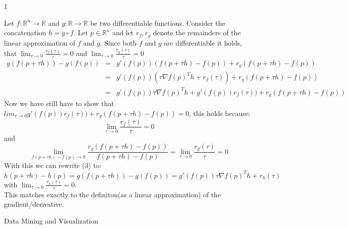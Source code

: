 \documentclass{article}
\begin{document}
\begin{ukon-infie}[12.11.17]{1}
		\begin{exercise}[p=10]{}
		Let $f: \mathbb{R}^n \rightarrow \mathbb{R}$ and $g: \mathbb{R} \rightarrow \mathbb{R}$ be two differentiable functions. Consider the concatenation $h = g \circ f$. Let $p \in \mathbb{R}^n$ and let $r_f , r_g$ denote the remainders of the linear approximation of $f$ and $g$. Since both $f$ and $g$ are differentiable it holds, that $\lim_{\tau \to 0}\frac{r_f(\tau)}{\tau} = 0$ and $\lim_{\tau \to 0}\frac{r_g(\tau)}{\tau} = 0$ \\
		\begin{eqnarray}
		g(f(p + \tau h)) - g(f(p)) & = & g'(f(p))(f(p + \tau h) - f(p)) + r_g(f(p + \tau h) - f(p)) \\
												& = & g'(f(p))(\tau \nabla f(p)^T h + r_f(\tau)) + r_g(f(p + \tau h) - f(p)) \\
											  & = & g'(f(p))\tau \nabla f(p)^T h + g'(f(p)) r_f(\tau)) + r_g(f(p + \tau h) - f(p))
		\end{eqnarray}
		Now we have still have to show that $lim_{\tau \to 0}g'(f(p)) r_f(\tau)) + r_g(f(p + \tau h) - f(p)) = 0$, this holds because:\\
		$$\lim_{\tau \to 0}\frac{r_f(\tau)}{\tau} = 0$$ and $$\lim_{f(p + \tau h) - f(p) \to 0}\frac{r_g(f(p + \tau h) - f(p))}{f(p + \tau h) - f(p)} = \lim_{\tau \to 0}\frac{r_g(\tau)}{\tau} = 0$$With this we can rewrite (3) to: \\
		
		$$h (p + \tau h) - h(p) = g(f(p + \tau h)) - g(f(p)) = g'(f(p))\tau \nabla f(p)^T h + r_h(\tau)$$ with $\lim_{\tau \to 0}\frac{r_h(\tau)}{\tau} = 0$. \\This matches exactly to the definiton(as a linear approximation) of the gradient/derivative.
        	
		\end{exercise}
		
		


		\begin{exercise}[p=2]{Data Mining and Visualization}
		
		


\end{exercise}
\end{ukon-infie}
\end{document}
